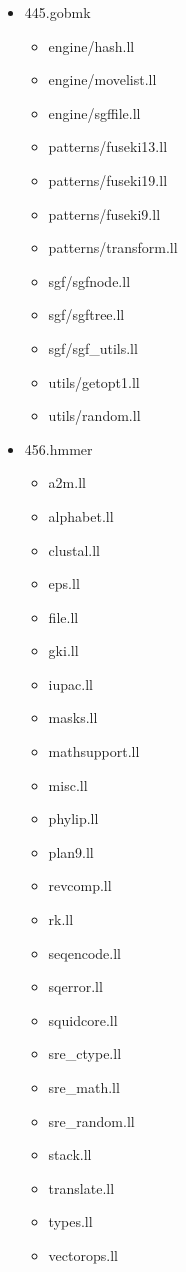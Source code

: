 \begin{multicols}{3}
\begin{itemize}
	\item 445.gobmk
	\begin{itemize}
		\item engine/hash.ll
		\item engine/movelist.ll
		\item engine/sgffile.ll
		\item patterns/fuseki13.ll
		\item patterns/fuseki19.ll
		\item patterns/fuseki9.ll
		\item patterns/transform.ll
		\item sgf/sgfnode.ll
		\item sgf/sgftree.ll
		\item sgf/sgf\_utils.ll
		\item utils/getopt1.ll
		\item utils/random.ll
	\end{itemize}

	\item 456.hmmer
	\begin{itemize}
		\item a2m.ll
		\item alphabet.ll
		\item clustal.ll
		\item eps.ll
		\item file.ll
		\item gki.ll
		\item iupac.ll
		\item masks.ll
		\item mathsupport.ll
		\item misc.ll
		\item phylip.ll
		\item plan9.ll
		\item revcomp.ll
		\item rk.ll
		\item seqencode.ll
		\item sqerror.ll
		\item squidcore.ll
		\item sre\_ctype.ll
		\item sre\_math.ll
		\item sre\_random.ll
		\item stack.ll
		\item translate.ll
		\item types.ll
		\item vectorops.ll
	\end{itemize}


\end{itemize}
\end{multicols}
